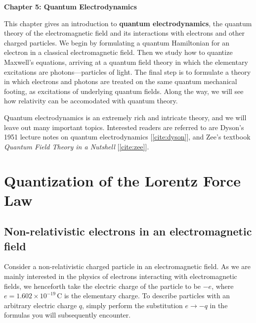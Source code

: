 \documentclass[pra,12pt]{revtex4}
\begin{document}
\setcounter{page}{86}

\begin{center}
{\Large \textbf{Chapter 5: Quantum Electrodynamics}}
\end{center}


This chapter gives an introduction to \textbf{quantum
  electrodynamics}, the quantum theory of the electromagnetic field
and its interactions with electrons and other charged particles.  We
begin by formulating a quantum Hamiltonian for an electron in a
classical electromagnetic field.  Then we study how to quantize
Maxwell's equations, arriving at a quantum field theory in which the
elementary excitations are photons---particles of light.  The final
step is to formulate a theory in which electrons and photons are
treated on the same quantum mechanical footing, as excitations of
underlying quantum fields.  Along the way, we will see how relativity
can be accomodated with quantum theory.

Quantum electrodynamics is an extremely rich and intricate theory, and
we will leave out many important topics.  Interested readers are
referred to are Dyson's 1951 lecture notes on quantum electrodynamics
[\ref{cite:dyson}], and Zee's textbook \textit{Quantum Field Theory in
  a Nutshell} [\ref{cite:zee}].

\section{Quantization of the Lorentz Force Law}

\subsection{Non-relativistic electrons in an electromagnetic field}
\label{sec:nonrel}

Consider a non-relativistic charged particle in an electromagnetic
field.  As we are mainly interested in the physics of electrons
interacting with electromagnetic fields, we henceforth take the
electric charge of the particle to be $-e$, where $e =
1.602\times10^{-19}\,\mathrm{C}$ is the elementary charge.  To
describe particles with an arbitrary electric charge $q$, simply
perform the substitution $e \rightarrow -q$ in the formulas you will
subsequently encounter.
\end{document}

